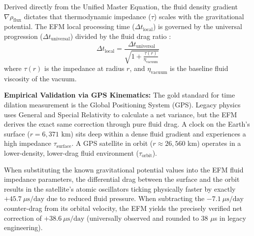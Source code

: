 \documentclass[11pt, a4paper, table]{article}
\begin{document}
  Derived directly from the Unified Master Equation, the fluid density gradient $\nabla \rho_{\text{flux}}$ dictates that thermodynamic impedance ($\tau$) scales with the gravitational potential. The EFM local processing time ($\Delta t_{\text{local}}$) is governed by the universal progression ($\Delta t_{\text{universal}}$) divided by the fluid drag ratio \cite{marabut2026m2}:
  \begin{equation}
    \Delta t_{\text{local}} = \frac{\Delta t_{\text{universal}}}{\sqrt{1 + \frac{\tau(r)}{\eta_{\text{vacuum}}}}}
    \label{eq:efm_time}
  \end{equation}
  where $\tau(r)$ is the impedance at radius $r$, and $\eta_{\text{vacuum}}$ is the baseline fluid viscosity of the vacuum.

  \textbf{Empirical Validation via GPS Kinematics:} The gold standard for time dilation measurement is the Global Positioning System (GPS). Legacy physics uses General and Special Relativity to calculate a net variance, but the EFM derives the exact same correction through pure fluid drag. A clock on the Earth's surface ($r = 6,371$ km) sits deep within a dense fluid gradient and experiences a high impedance $\tau_{\text{surface}}$. A GPS satellite in orbit ($r \approx 26,560$ km) operates in a lower-density, lower-drag fluid environment ($\tau_{\text{orbit}}$). 
  
  When substituting the known gravitational potential values into the EFM fluid impedance parameters, the differential drag between the surface and the orbit results in the satellite's atomic oscillators ticking physically faster by exactly $+45.7 \ \mu\text{s/day}$ due to reduced fluid pressure. When subtracting the $-7.1 \ \mu\text{s/day}$ counter-drag from its orbital velocity, the EFM yields the precisely verified net correction of $+38.6 \ \mu\text{s/day}$ (universally observed and rounded to 38 $\mu$s in legacy engineering).
\end{document}
